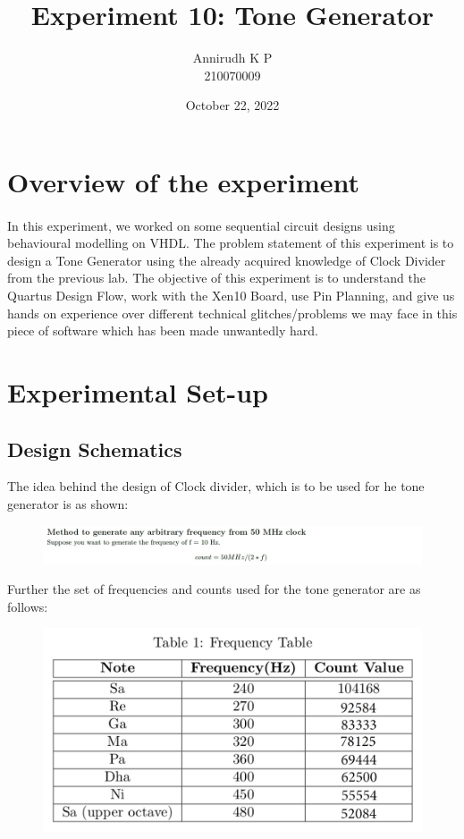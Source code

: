 \documentclass[12pt]{article}
\title{Experiment 10: Tone Generator}
\author{Annirudh K P\\%
210070009}
\date{October 22, 2022}
\begin{document}
\maketitle

\section{Overview of the experiment}
\paragraph{}
In this experiment, we worked on some sequential circuit designs using behavioural modelling on VHDL. The problem statement of this experiment is to design a Tone Generator using the already acquired knowledge of Clock Divider from the previous lab. The objective of this experiment is to understand the Quartus Design Flow, work with the Xen10 Board, use Pin Planning, and give us hands on experience over different technical glitches/problems we may face in this piece of software which has been made unwantedly hard.

\section{Experimental Set-up}

\subsection{Design Schematics}
The idea behind the design of Clock divider, which is to be used for he tone generator is as shown:

\begin{figure}[H]
\centering
  \includegraphics*[scale=0.7]{Images/ClockDiv_Design.jpeg}
\end{figure}

Further the set of frequencies and counts used for the tone generator are as follows:

\begin{figure}[H]
\centering
  \includegraphics*[scale=0.5]{Images/ToneGen_Design.jpeg}
\end{figure}
\end{document}
